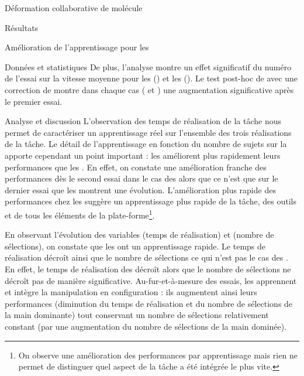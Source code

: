 \documentclass[myfrancais,ngerman,english,frenchb]{mythesis}
\begin{document}
\begin{mychapter}{Déformation collaborative de molécule}
\begin{mysection}{Résultats}
\begin{mysubsection}{Amélioration de l'apprentissage pour les }
\begin{mysubsubsection}{Données et statistiques}
					De plus, l'analyse montre un effet significatif du numéro de l'essai  sur la vitesse moyenne  pour les  () et les  ().
					Le test post-hoc de  avec une correction de  montre dans chaque cas ( et ) une augmentation significative après le premier essai.
				\end{mysubsubsection}
				\begin{mysubsubsection}{Analyse et discussion}
					L'observation des temps de réalisation de la tâche  nous permet de caractériser un apprentissage réel sur l'ensemble des trois réalisations de la tâche.
					Le détail de l'apprentissage en fonction du nombre de sujets sur la  apporte cependant un point important : les  améliorent plus rapidement leurs performances que les .
					En effet, on constate une amélioration franche des performances dès le second essai dans le cas des  alors que ce n'est que sur le dernier essai que les  montrent une évolution.
					L'amélioration plus rapide des performances chez les  suggère un apprentissage plus rapide de la tâche, des outils et de tous les éléments de la plate-forme\footnote{On observe une amélioration des performances par apprentissage mais rien ne permet de distinguer quel aspect de la tâche a été intégrée le plus vite.}.

					En observant l'évolution des variables  (temps de réalisation) et  (nombre de sélections), on constate que les  ont un apprentissage rapide.
					Le temps de réalisation décroît ainsi que le nombre de sélections ce qui n'est pas le cas des .
					En effet, le temps de réalisation des  décroît alors que le nombre de sélections ne décroît pas de manière significative.
					Au-fur-et-à-mesure des essais, les  apprennent et intègre la manipulation en configuration  : ils augmentent ainsi leurs performances (diminution du temps de réalisation et du nombre de sélections de la main dominante) tout conservant un nombre de sélections relativement constant (par une augmentation du nombre de sélections de la main dominée).


\end{mysubsubsection}
\end{mysubsection}
\end{mysection}
\end{mychapter}
\end{document}
